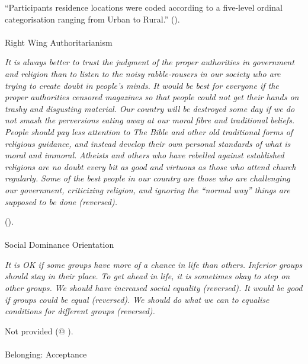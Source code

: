 \documentclass[
  single column]{article}
\makeatletter
\let\oldparagraph\paragraph
\renewcommand{\paragraph}{
    \@ifstar
      \xxxParagraphStar
      \xxxParagraphNoStar
  }
\newcommand{\xxxParagraphStar}[1]{\oldparagraph*{#1}\mbox{}}
\newcommand{\xxxParagraphNoStar}[1]{\oldparagraph{#1}\mbox{}}
\makeatother
\begin{document}
``Participants residence locations were coded according to a five-level
ordinal categorisation ranging from Urban to Rural.''
().

\paragraph{Right Wing
Authoritarianism}\label{right-wing-authoritarianism}

\emph{It is always better to trust the judgment of the proper
authorities in government and religion than to listen to the noisy
rabble-rousers in our society who are trying to create doubt in people's
minds.} \emph{It would be best for everyone if the proper authorities
censored magazines so that people could not get their hands on trashy
and disgusting material.} \emph{Our country will be destroyed some day
if we do not smash the perversions eating away at our moral fibre and
traditional beliefs.} \emph{People should pay less attention to The
Bible and other old traditional forms of religious guidance, and instead
develop their own personal standards of what is moral and immoral.}
\emph{Atheists and others who have rebelled against established
religions are no doubt every bit as good and virtuous as those who
attend church regularly.} \emph{Some of the best people in our country
are those who are challenging our government, criticizing religion, and
ignoring the ``normal way'' things are supposed to be done (reversed).}

().

\paragraph{Social Dominance
Orientation}\label{social-dominance-orientation}

\emph{It is OK if some groups have more of a chance in life than
others.} \emph{Inferior groups should stay in their place.} \emph{To get
ahead in life, it is sometimes okay to step on other groups.} \emph{We
should have increased social equality (reversed).} \emph{It would be
good if groups could be equal (reversed).} \emph{We should do what we
can to equalise conditions for different groups (reversed).}

Not provided (@ ).

\paragraph{Belonging: Acceptance}\label{belonging-acceptance}
\end{document}
